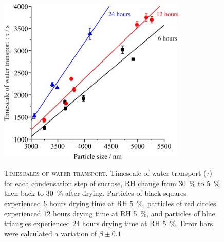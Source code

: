 \begin{figure}
    \centering
    \caption[Timescales of water transport]{\textsc{Timescales of water transport}. Timescale of water transport ($\tau$) for each condensation step of sucrose, RH change from \SI{30}{\percent} to \SI{5}{\percent} then back to \SI{30}{\percent} after drying. Particles of black squares experienced \num{6} hours drying time at RH \SI{5}{\percent}, particles of red circles experienced \num{12} hours drying time at RH \SI{5}{\percent}, and particles of blue triangles experienced \num{24} hours drying time at RH \SI{5}{\percent}. Error bars were calculated a variation of $\beta \pm \num{0.1}$.}
    \includegraphics[width=0.8\textwidth]{chapters/water_hopping/figures/image006.jpg}
    \label{fig:wat_s4}
\end{figure}

